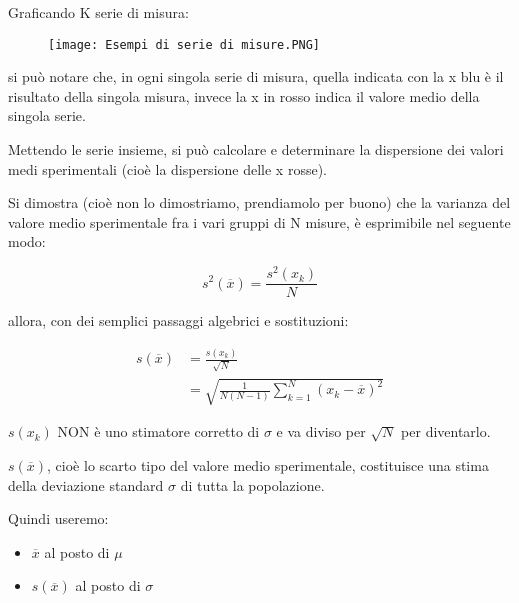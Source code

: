 Graficando K serie di misura: 

\begin{figure}[h]
    \centering
    \texttt{[image: Esempi di serie di misure.PNG]}
\end{figure}

si può notare che, in ogni singola serie di misura, quella indicata con la x blu è il risultato della singola misura, 
invece la x in rosso indica il valore medio della singola serie. \newline 

Mettendo le serie insieme, si può calcolare e determinare la dispersione dei valori medi sperimentali (cioè la dispersione delle x rosse). \newline 

Si dimostra (cioè non lo dimostriamo, prendiamolo per buono) che la varianza del valore medio sperimentale fra i vari gruppi di N misure, 
è esprimibile nel seguente modo: 

{
    \Large 
    \begin{equation}
        s^{2} (\overline{x}) 
        = 
        \frac{s^{2} (x_k)}{N}
    \end{equation}
}

allora, con dei semplici passaggi algebrici e sostituzioni: 

{
    \Large 
    \begin{equation}
        \begin{split}
            s(\overline{x})
            &= 
            \frac{s(x_k)}{\sqrt{N}} 
            \\ 
            &= 
            \sqrt
            {
                \frac{1}{N (N-1)}
                \sum_{k = 1}^{N}
                (x_k - \overline{x})^{2}
            }
        \end{split}
    \end{equation}
}

$s(x_k)$ NON è uno stimatore corretto di $\sigma$ e va diviso per $\sqrt{N}$ per diventarlo. \newline 

$s(\overline{x})$, cioè lo scarto tipo del valore medio sperimentale, costituisce una stima della deviazione standard $\sigma$ di tutta la popolazione. \newline 

Quindi useremo: 

\begin{itemize}
    \item $\overline{x}$ al posto di $\mu$ 
    \item $s(\overline{x})$ al posto di $\sigma$
\end{itemize}

